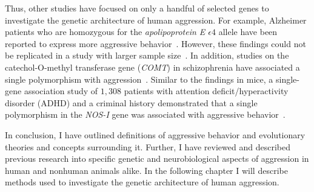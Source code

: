 Thus, other studies have focused on only a handful of selected genes to investigate the genetic architecture of human aggression.
For example, Alzheimer patients who are homozygous for the \textit{apolipoprotein E $\epsilon 4$} allele have been reported to express more aggressive behavior~\cite{Craig2004,VanDerFlier2006}.
However, these findings could not be replicated in a study with larger sample size~\cite{Hollingworth2006}.
In addition, studies on the catechol-O-methyl transferase gene (\textit{COMT}) in schizophrenia have associated a single polymorphism with aggression~\cite{Hirata2013,Calati2011}.
Similar to the findings in mice, a single-gene association study of $1,308$ patients with attention deficit/hyperactivity disorder (ADHD) and a criminal history demonstrated that a single polymorphism in the \textit{NOS-I} gene was associated with aggressive behavior~\cite{Reif2009}.

\bigskip
In conclusion, I have outlined definitions of aggressive behavior and evolutionary theories and concepts surrounding it.
Further, I have reviewed and described previous research into specific genetic and neurobiological aspects of aggression in human and nonhuman animals alike.
In the following chapter I will describe methods used to investigate the genetic architecture of human aggression.
